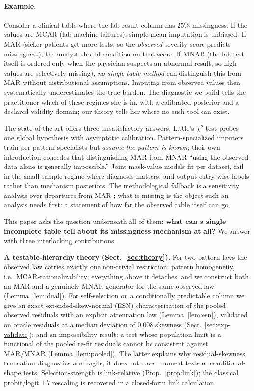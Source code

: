 \documentclass[conference]{IEEEtran}
\begin{document}
\paragraph{Example.} Consider a clinical table where the lab-result column has $25\%$
missingness. If the values are MCAR (lab machine failures), simple mean imputation is
unbiased. If MAR (sicker patients get more tests, so the \emph{observed} severity score
predicts missingness), the analyst should condition on that score. If MNAR (the lab test
itself is ordered only when the physician suspects an abnormal result, so high values are
selectively missing), \emph{no single-table method} can distinguish this from MAR without
distributional assumptions. Imputing from observed values then systematically underestimates
the true burden. The diagnostic we build tells the practitioner which of these
regimes she is in, with a calibrated posterior and a declared validity domain; our theory
tells her where no such tool can exist.

The state of the art offers three unsatisfactory answers. Little's $\chi^2$ test \cite{little1988}
probes one global hypothesis with asymptotic calibration. Pattern-specialized
imputers \cite{feitelberg2025} train per-pattern specialists but \emph{assume the pattern is
known}; their own introduction concedes that distinguishing MAR from MNAR ``using the observed
data alone is generally impossible.'' Joint mask-value models \cite{diffjoint2026,missbgm2026}
fit per dataset, fail in the small-sample regime where diagnosis matters, and output
entry-wise labels rather than mechanism posteriors. The methodological
fallback is a sensitivity analysis over departures from MAR \cite{mk2007}; what is missing is
the object such an analysis needs first: a statement of how far the observed table itself can go.

This paper asks the question underneath all of them: \textbf{what can a single incomplete table
tell about its missingness mechanism at all?} We answer with three interlocking contributions.

\textbf{A testable-hierarchy theory (Sect.~\ref{sec:theory}).} For two-pattern laws the observed
law carries exactly one non-trivial restriction: pattern homogeneity, i.e.\ MCAR-rationalizability;
everything above it detaches, and we construct both an MAR and a genuinely-MNAR generator for the
same observed law (Lemma~\ref{lem:dual}). For self-selection on a conditionally predictable column
we give an exact extended-skew-normal (ESN) characterization of the pooled observed residuals with
an explicit attenuation law (Lemma~\ref{lem:esn}), validated on oracle residuals at a median
deviation of $0.008$ skewness (Sect.~\ref{sec:exp-validate}); and an impossibility result: a test
whose population limit is a functional of the pooled re-fit residuals cannot be consistent against
MAR/MNAR (Lemma~\ref{lem:pooled}). The latter explains why residual-skewness truncation
diagnostics are fragile; it does not cover moment tests or conditional-shape tests.
Selection-strength is link-relative (Prop.~\ref{prop:link}); the classical probit/logit $1.7$
rescaling is recovered in a closed-form link calculation.
\end{document}
